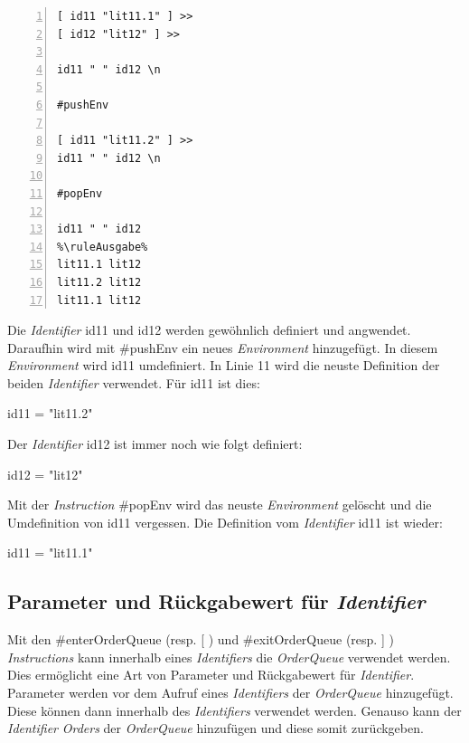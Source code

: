 \begin{minipage}{\linewidth}
\begin{multicols}{2}
\begin{lstlisting}[language=QHS, caption=Beispiel zu \textit{Environments}, numbers=left, stepnumber=1]
%\ruleEingabe%
[ id11 "lit11.1" ] >>
[ id12 "lit12" ] >>

id11 " " id12 \n

#pushEnv

[ id11 "lit11.2" ] >>
id11 " " id12 \n

#popEnv

id11 " " id12
%\ruleAusgabe%
lit11.1 lit12
lit11.2 lit12
lit11.1 lit12
\end{lstlisting}
\columnbreak
Die \textit{Identifier} {\selectListingFont id11} und {\selectListingFont id12} werden gewöhnlich definiert und angwendet. Daraufhin wird mit {\selectListingFont \#pushEnv} ein neues \textit{Environment} hinzugefügt.
In diesem \textit{Environment} wird {\selectListingFont id11} umdefiniert. In Linie 11 wird die neuste Definition der beiden \textit{Identifier} verwendet. Für {\selectListingFont id11} ist dies: \break
\centerline{\selectListingFont id11 = "lit11.2"}
Der \textit{Identifier} {\selectListingFont id12} ist immer noch wie folgt definiert: \break
\centerline{\selectListingFont id12 = "lit12"}
Mit der \textit{Instruction} {\selectListingFont \#popEnv} wird das neuste \textit{Environment} gelöscht und die Umdefinition von {\selectListingFont id11} vergessen.
Die Definition vom \textit{Identifier} {\selectListingFont id11} ist wieder:
\centerline{\selectListingFont id11 = "lit11.1"}
\end{multicols}
\end{minipage}



\subsection{Parameter und Rückgabewert für \textit{Identifier}}
Mit den {\listingFont\selectfont \#enterOrderQueue} (resp. {\listingFont\selectfont [} ) und {\listingFont\selectfont \#exitOrderQueue} (resp. {\listingFont\selectfont ]} ) \textit{Instructions}
kann innerhalb eines \textit{Identifiers} die \textit{OrderQueue} verwendet werden.
Dies ermöglicht eine Art von Parameter und Rückgabewert für \textit{Identifier}.
Parameter werden vor dem Aufruf eines \textit{Identifiers} der \textit{OrderQueue} hinzugefügt. Diese können dann innerhalb des \textit{Identifiers} verwendet werden.
Genauso kann der \textit{Identifier} \textit{Orders} der \textit{OrderQueue} hinzufügen und diese somit zurückgeben.

